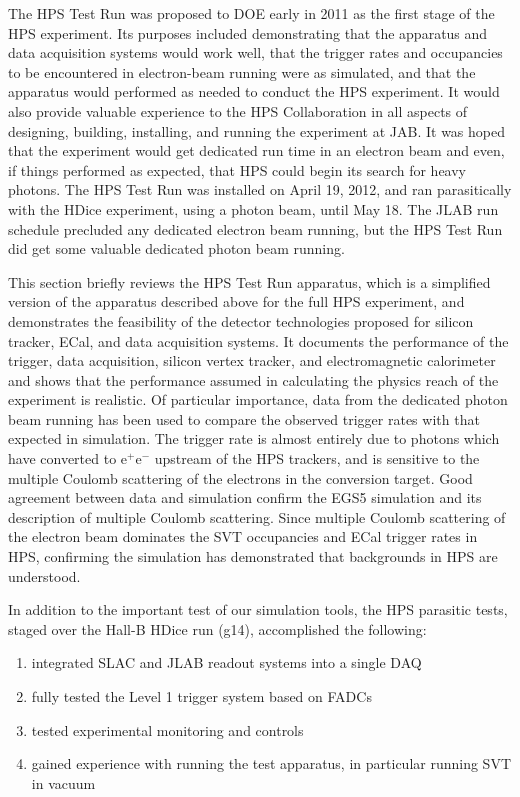 The HPS Test Run was proposed to DOE early in 2011 as the first stage of the HPS experiment. Its
purposes included demonstrating that the apparatus and data acquisition systems would work well,
that the trigger rates and occupancies to be encountered in electron-beam running were as simulated,
and that the apparatus would performed as needed to conduct the HPS experiment. It would also
provide valuable experience to the HPS Collaboration in all aspects of designing, building, installing,
and running the experiment at JAB. It was hoped that the experiment would get dedicated run time
in an electron beam and even, if things performed as expected, that HPS could begin its search for
heavy photons. The HPS Test Run was installed on April 19, 2012, and ran parasitically with the HDice
experiment, using a photon beam, until May 18. The JLAB run schedule precluded any dedicated
electron beam running, but the HPS Test Run did get some valuable dedicated photon beam running.

This section briefly reviews the HPS Test Run apparatus, which is a simplified version of the apparatus
described above for the full HPS experiment, and demonstrates the feasibility of the detector
technologies proposed for silicon tracker, ECal, and data acquisition systems. It documents the
performance of the trigger, data acquisition, silicon vertex tracker, and electromagnetic calorimeter
and shows that the performance assumed in calculating the physics reach of the experiment is realistic.
Of particular importance, data from the dedicated photon beam running has been used to compare
the observed trigger rates with that expected in simulation. The trigger rate is almost entirely due to
photons which have converted to e$^+$e$^-$ upstream of the HPS trackers, and is sensitive to the multiple
Coulomb scattering of the electrons in the conversion target. Good agreement between data and
simulation confirm the EGS5 simulation and its description of multiple Coulomb scattering. Since
multiple Coulomb scattering of the electron beam dominates the SVT occupancies and ECal trigger rates
in HPS, confirming the simulation has demonstrated that backgrounds in HPS are understood.

In addition to the important test of our simulation tools, the HPS parasitic tests, staged over the Hall-B HDice run (g14), accomplished the following: 
\begin{enumerate}
\item  integrated SLAC and JLAB readout systems into a single DAQ
\item fully tested the Level 1 trigger system based on FADCs
\item tested experimental monitoring and controls
\item gained experience with running the test apparatus, in particular running SVT in vacuum
\end{enumerate}

